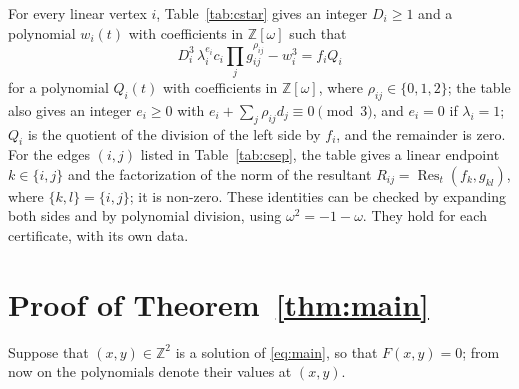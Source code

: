 \documentclass[11pt]{article}
\newcommand{\Z}{\mathbb{Z}}
\begin{document}
For every linear vertex $i$, Table~\ref{tab:cstar} gives an integer $D_i\geq1$ and a polynomial $w_i(t)$ with coefficients in $\Z[\omega]$ such that
\begin{equation}\label{eq:cstarlin}
D_i^3\,\lambda_i^{e_i}c_i\prod_jg_{ij}^{\rho_{ij}}-w_i^3=f_iQ_i
\end{equation}
for a polynomial $Q_i(t)$ with coefficients in $\Z[\omega]$, where $\rho_{ij}\in\{0,1,2\}$; the table also gives an integer $e_i\geq0$ with $e_i+\sum_j\rho_{ij}d_j\equiv0\pmod3$, and $e_i=0$ if $\lambda_i=1$; $Q_i$ is the quotient of the division of the left side by $f_i$, and the remainder is zero.
For the edges $(i,j)$ listed in Table~\ref{tab:csep}, the table gives a linear endpoint $k\in\{i,j\}$ and the factorization of the norm of the resultant $R_{ij}=\operatorname{Res}_t(f_k,g_{kl})$, where $\{k,l\}=\{i,j\}$; it is non-zero.
These identities can be checked by expanding both sides and by polynomial division, using $\omega^2=-1-\omega$. They hold for each certificate, with its own data.

\section{Proof of Theorem~\ref{thm:main}}

Suppose that $(x,y)\in\Z^2$ is a solution of \eqref{eq:main}, so that $F(x,y)=0$; from now on the polynomials denote their values at $(x,y)$.
\end{document}
